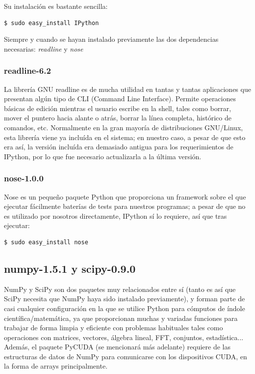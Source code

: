 \documentclass[twoside]{article}
\begin{document}
\vspace{5 mm}

Su instalación es bastante sencilla:

\begin{verbatim}
$ sudo easy_install IPython
\end{verbatim}

Siempre y cuando se hayan instalado previamente las dos dependencias necesarias: \emph{readline} y \emph{nose}

\subsubsection{readline-6.2}

La librería GNU readline es de mucha utilidad en tantas y tantas aplicaciones que presentan algún tipo de CLI (Command Line Interface). Permite operaciones básicas de edición mientras el usuario escribe en la shell, tales como borrar, mover el puntero hacia alante o atrás, borrar la línea completa, histórico de comandos, etc. Normalmente en la gran mayoría de distribuciones GNU/Linux, esta librería viene ya incluída en el sistema; en nuestro caso, a pesar de que esto era así, la versión incluída era demasiado antigua para los requerimientos de IPython, por lo que fue necesario actualizarla a la última versión.

\subsubsection{nose-1.0.0}

Nose es un pequeño paquete Python que proporciona un framework sobre el que ejecutar fácilmente baterías de tests para nuestros programas; a pesar de que no es utilizado por nosotros directamente, IPython sí lo requiere, así que tras ejecutar:

\begin{verbatim}
$ sudo easy_install nose
\end{verbatim}

\subsection{numpy-1.5.1 y scipy-0.9.0}
NumPy y SciPy son dos paquetes muy relacionados entre sí (tanto es así que SciPy necesita que NumPy haya sido instalado previamente), y forman parte de casi cualquier configuración en la que se utilice Python para cómputos de índole científica/matemática, ya que proporcionan muchas y variadas funciones para trabajar de forma limpia y eficiente con problemas habituales tales como operaciones con matrices, vectores, álgebra lineal, FFT, conjuntos, estadística... Además, el paquete PyCUDA (se mencionará más adelante) requiere de las estructuras de datos de NumPy para comunicarse con los dispositivos CUDA, en la forma de arrays principalmente.
\end{document}
